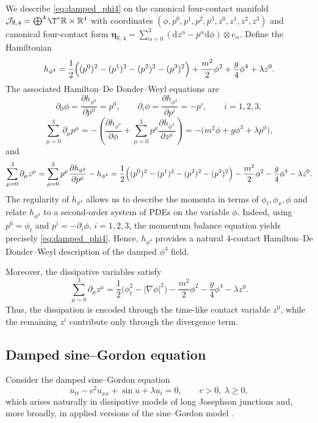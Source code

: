 \documentclass[11pt,a4paper]{article}
\newcommand{\dd}{\mathrm{d}}
\theoremstyle{plain} \newtheorem{theorem}{Theorem}[section] \newtheorem{proposition}[theorem]{Proposition} \newtheorem{corollary}[theorem]{Corollary} \newtheorem{lemma}[theorem]{Lemma} \theoremstyle{definition} \newtheorem{definition}[theorem]{Definition} \theoremstyle{remark} \newtheorem{remark}[theorem]{Remark} \newtheorem{example}[theorem]{Example} %
\begin{document}
We describe \eqref{eq:damped_phi4} on the canonical four-contact manifold \(\mathcal J_{\mathbb R,4}=\bigoplus^4 \T^*\mathbb R\times\mathbb R^4\) with coordinates \((\phi,p^0,p^1,p^2,p^3,z^0,z^1,z^2,z^3)\) and canonical four-contact form \(\bm\eta_{\mathbb{R},4}=\sum_{\alpha=0}^3(\dd z^\alpha-p^\alpha \dd\phi)\otimes e_\alpha.\) Define the Hamiltonian
\[
h_{\phi^4}
=
\frac12\Bigl((p^0)^2-(p^1)^2-(p^2)^2-(p^3)^2\Bigr)
+\frac{m^2}{2}\phi^2+\frac{g}{4}\phi^4+\lambda z^0.
\]
The associated Hamilton--De Donder--Weyl equations are
\[
\partial_0\phi=\frac{\partial h_{\phi^4}}{\partial p^0}=p^0,\qquad
\partial_i\phi=\frac{\partial h_{\phi^4}}{\partial p^i}=-p^i,\qquad i=1,2,3,
\]
\[
\sum_{\mu=0}^3\partial_\mu p^\mu
=
-\left(
\frac{\partial h_{\phi^4}}{\partial \phi}
+\sum_{\mu=0}^3 p^\mu \frac{\partial h_{\phi^4}}{\partial z^\mu}
\right)
=
-\bigl(m^2\phi+g\phi^3+\lambda p^0\bigr),
\]
and
\[
\sum_{\mu=0}^3\partial_\mu z^\mu
=
\sum_{\mu=0}^3 p^\mu \frac{\partial h_{\phi^4}}{\partial p^\mu}-h_{\phi^4}
=
\frac12\Bigl((p^0)^2-(p^1)^2-(p^2)^2-(p^3)^2\Bigr)
-\frac{m^2}{2}\phi^2-\frac{g}{4}\phi^4-\lambda z^0.
\]
The regularity of $h_{\phi^4}$ allows us to describe the momenta in terms of $\phi_t,\phi_x,\phi$ and relate $h_{\phi^4}$ to a second-order system of PDEs on the variable $\phi$. Indeed, using \(p^0=\phi_t\) and \(p^i=-\partial_i\phi\), \(i=1,2,3\), the momentum balance equation yields precisely \eqref{eq:damped_phi4}. Hence, \(h_{\phi^4}\) provides a natural \(4\)-contact Hamilton--De Donder--Weyl description of the damped \(\phi^4\) field.

Moreover, the dissipative variables satisfy
\[
\sum_{\mu=0}^3\partial_\mu z^\mu
=
\frac12\bigl(\phi_t^2-|\nabla\phi|^2\bigr)
-\frac{m^2}{2}\phi^2-\frac{g}{4}\phi^4-\lambda z^0.
\]
Thus, the dissipation is encoded through the time-like contact variable \(z^0\), while the remaining \(z^i\) contribute only through the divergence term.

\subsection{Damped sine--Gordon equation}
\label{subsec:damped_sG}

Consider the damped sine--Gordon equation
\begin{equation}\label{eq:damped_sine_gordon}
u_{tt}-c^2u_{xx}+\sin u+\lambda u_t=0,
\qquad c>0,\ \lambda\ge0,
\end{equation}
which arises naturally in dissipative models of long Josephson junctions and, more broadly, in applied versions of the sine--Gordon model \cite{McLaughlinScott1978,CostabileEtAl1978,CuevasMaraverKevrekidisWilliams2014}.
\end{document}
